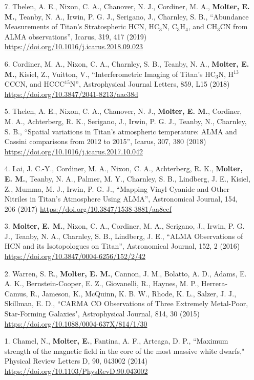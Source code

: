 \documentclass[margin, 10pt]{res} %
\begin{document}
\begin{resume}
{\begin{enumerate}
\item[7.] Thelen, A. E., Nixon, C. A., Chanover, N. J., Cordiner, M. A., {\bf Molter, E. M.}, Teanby, N. A., Irwin, P. G. J., Serigano, J., Charnley, S. B., ``Abundance Measurements of Titan's Stratospheric HCN, HC$_3$N, C$_3$H$_4$, and CH$_3$CN from ALMA observations'', Icarus, 319, 417 (2019) \url{https://doi.org/10.1016/j.icarus.2018.09.023}

\item[6.] Cordiner, M. A., Nixon, C. A., Charnley, S. B., Teanby, N. A., {\bf Molter, E. M.}, Kisiel, Z., Vuitton, V., ``Interferometric Imaging of Titan's HC$_3$N, H$^{13}$\textrm{CCC}N, and HCCC$^{15}$N'', Astrophysical Journal Letters, 859, L15 (2018) \url{https://doi.org/10.3847/2041-8213/aac38d}

\item[5.] Thelen, A. E.,  Nixon, C. A., Chanover, N. J., {\bf Molter, E. M.}, Cordiner, M. A., Achterberg, R. K., Serigano, J., Irwin, P. G. J., Teanby, N., Charnley, S. B., ``Spatial variations in Titan's atmospheric temperature: ALMA and Cassini comparisons from 2012 to 2015'', Icarus, 307, 380 (2018) \url{https://doi.org/10.1016/j.icarus.2017.10.042}

\item[4.] Lai, J. C.-Y., Cordiner, M. A., Nixon, C. A., Achterberg, R. K., {\bf Molter, E. M.}, Teanby, N. A., Palmer, M. Y., Charnley, S. B., Lindberg, J. E., Kisiel, Z., Mumma, M. J., Irwin, P. G. J., ``Mapping Vinyl Cyanide and Other Nitriles in Titan’s Atmosphere Using ALMA'', Astronomical Journal, 154, 206 (2017) \url{https://doi.org/10.3847/1538-3881/aa8eef}

\item[3.] {\bf Molter, E. M.}, Nixon, C. A., Cordiner, M. A., Serigano, J., Irwin, P. G. J., Teanby, N. A., Charnley, S. B., Lindberg, J. E., ``ALMA Observations of
  HCN and its Isotopologues on Titan'', Astronomical Journal, 152, 2 (2016) \url{https://doi.org/10.3847/0004-6256/152/2/42}
  
\item[2.] Warren, S. R., {\bf Molter, E. M.}, Cannon, J. M., Bolatto, A. D., Adams, E. A. K., Bernstein-Cooper, E. Z., Giovanelli, R., Haynes, M. P., Herrera-Camus, R., Jameson, K., McQuinn, K. B. W., Rhode, K. L., Salzer, J. J., Skillman, E. D., ``CARMA
  CO Observations of Three Extremely Metal-Poor, Star-Forming
  Galaxies", Astrophysical Journal, 814, 30 (2015) \url{https://doi.org/10.1088/0004-637X/814/1/30}
  
\item[1.] Chamel, N., {\bf Molter, E.}, Fantina, A. F., Arteaga, D. P., ``Maximum strength of the magnetic field in the core of the most massive white dwarfs," Physical Review Letters D, 90, 043002 (2014) \url{https://doi.org/10.1103/PhysRevD.90.043002}
\end{enumerate}

}
\end{resume}
\end{document}
